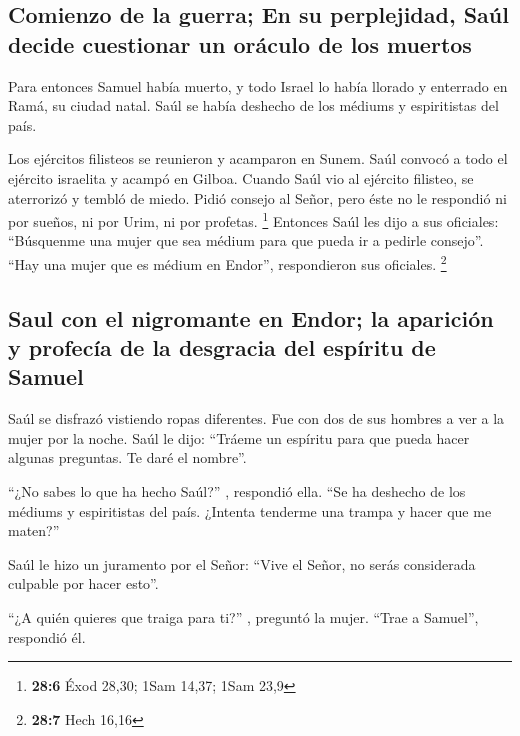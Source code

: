 \hypertarget{comienzo-de-la-guerra-en-su-perplejidad-sauxfal-decide-cuestionar-un-oruxe1culo-de-los-muertos}{%
\subsection{Comienzo de la guerra; En su perplejidad, Saúl decide
cuestionar un oráculo de los
muertos}\label{comienzo-de-la-guerra-en-su-perplejidad-sauxfal-decide-cuestionar-un-oruxe1culo-de-los-muertos}}

 Para entonces Samuel había muerto, y todo Israel lo había
llorado y enterrado en Ramá, su ciudad natal. Saúl se había deshecho de
los médiums y espiritistas del país.

 Los ejércitos filisteos se reunieron y acamparon en
Sunem. Saúl convocó a todo el ejército israelita y acampó en Gilboa.
 Cuando Saúl vio al ejército filisteo, se aterrorizó y
tembló de miedo.  Pidió consejo al Señor, pero éste no le
respondió ni por sueños, ni por Urim, ni por profetas. \footnote{\textbf{28:6}
  Éxod 28,30; 1Sam 14,37; 1Sam 23,9}  Entonces Saúl les
dijo a sus oficiales: ``Búsquenme una mujer que sea médium para que
pueda ir a pedirle consejo''. ``Hay una mujer que es médium en Endor'',
respondieron sus oficiales. \footnote{\textbf{28:7} Hech 16,16}

\hypertarget{saul-con-el-nigromante-en-endor-la-apariciuxf3n-y-profecuxeda-de-la-desgracia-del-espuxedritu-de-samuel}{%
\subsection{Saul con el nigromante en Endor; la aparición y profecía de
la desgracia del espíritu de
Samuel}\label{saul-con-el-nigromante-en-endor-la-apariciuxf3n-y-profecuxeda-de-la-desgracia-del-espuxedritu-de-samuel}}

 Saúl se disfrazó vistiendo ropas diferentes. Fue con dos
de sus hombres a ver a la mujer por la noche. Saúl le dijo: ``Tráeme un
espíritu para que pueda hacer algunas preguntas. Te daré el nombre''.

 ``¿No sabes lo que ha hecho Saúl?'' , respondió ella.
``Se ha deshecho de los médiums y espiritistas del país. ¿Intenta
tenderme una trampa y hacer que me maten?''

 Saúl le hizo un juramento por el Señor: ``Vive el Señor,
no serás considerada culpable por hacer esto''.

 ``¿A quién quieres que traiga para ti?'' , preguntó la
mujer. ``Trae a Samuel'', respondió él.


